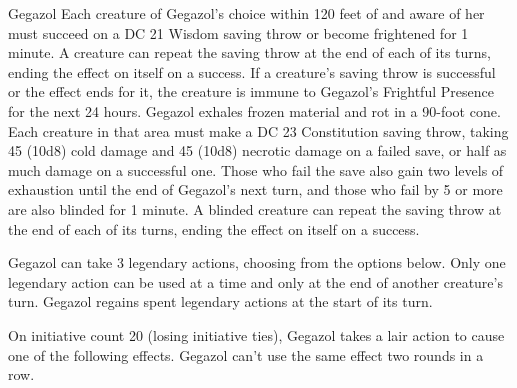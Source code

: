 \documentclass[10pt,a4paper,twoside,twocolumn,openany,bg=print,nodeprecatedcode]{dndbook}
\begin{document}
\begin{DndMonster}[float*=t]{Gegazol}
Each creature of Gegazol's choice within 120 feet of and aware of her must succeed on a DC 21 Wisdom saving throw or become frightened for 1 minute. A creature can repeat the saving throw at the end of each of its turns, ending the effect on itself on a success. If a creature's saving throw is successful or the effect ends for it, the creature is immune to Gegazol's Frightful Presence for the next 24 hours.
Gegazol exhales frozen material and rot in a 90-foot cone. Each creature in that area must make a DC 23 Constitution saving throw, taking 45 (10d8) cold damage and 45 (10d8) necrotic damage on a failed save, or half as much damage on a successful one. Those who fail the save also gain two levels of exhaustion until the end of Gegazol's next turn, and those who fail by 5 or more are also blinded for 1 minute. A blinded creature can repeat the saving throw at the end of each of its turns, ending the effect on itself on a success.
\par
{}
Gegazol can take 3 legendary actions, choosing from the options below. Only one legendary action can be used at a time and only at the end of another creature's turn. Gegazol regains spent legendary actions at the start of its turn.
\begin{DndMonsterLegendaryActions}
\end{DndMonsterLegendaryActions}
\par {}
On initiative count 20 (losing initiative ties), Gegazol takes a lair action to cause one of the following effects. Gegazol can't use the same effect two rounds in a row.


\end{DndMonster}
\end{document}
